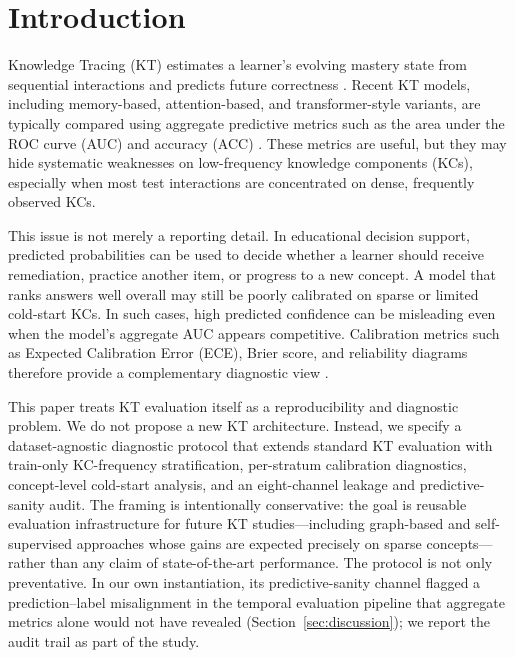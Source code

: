 \section{Introduction}
\label{sec:introduction}
Knowledge Tracing (KT) estimates a learner's evolving mastery state from sequential interactions and predicts future correctness \citep{corbett1994knowledge,piech2015deep,abdelrahman2023knowledge}. Recent KT models, including memory-based, attention-based, and transformer-style variants, are typically compared using aggregate predictive metrics such as the area under the ROC curve (AUC) and accuracy (ACC) \citep{zhang2017dynamic,ghosh2020context,liu2023simplekt}. These metrics are useful, but they may hide systematic weaknesses on low-frequency knowledge components (KCs), especially when most test interactions are concentrated on dense, frequently observed KCs.

This issue is not merely a reporting detail. In educational decision support, predicted probabilities can be used to decide whether a learner should receive remediation, practice another item, or progress to a new concept. A model that ranks answers well overall may still be poorly calibrated on sparse or limited cold-start KCs. In such cases, high predicted confidence can be misleading even when the model's aggregate AUC appears competitive. Calibration metrics such as Expected Calibration Error (ECE), Brier score, and reliability diagrams therefore provide a complementary diagnostic view \citep{guo2017calibration,brier1950verification,degroot1983comparison}.

This paper treats KT evaluation itself as a reproducibility and diagnostic problem. We do not propose a new KT architecture. Instead, we specify a dataset-agnostic diagnostic protocol that extends standard KT evaluation with train-only KC-frequency stratification, per-stratum calibration diagnostics, concept-level cold-start analysis, and an eight-channel leakage and predictive-sanity audit. The framing is intentionally conservative: the goal is reusable evaluation infrastructure for future KT studies---including graph-based and self-supervised approaches whose gains are expected precisely on sparse concepts---rather than any claim of state-of-the-art performance. The protocol is not only preventative. In our own instantiation, its predictive-sanity channel flagged a prediction--label misalignment in the temporal evaluation pipeline that aggregate metrics alone would not have revealed (Section~\ref{sec:discussion}); we report the audit trail as part of the study.

